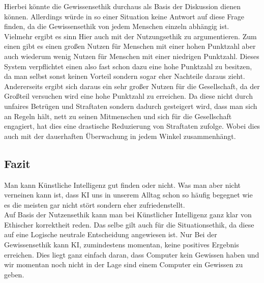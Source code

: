         Hierbei könnte die Gewissensethik durchaus als Basis der Diskussion dienen können. Allerdings würde in so einer Situation keine Antwort auf diese Frage finden, da die Gewissensethik von jedem Menschen einzeln abhängig ist.\\
        
        Vielmehr ergibt es sinn Hier auch mit der Nutzungsethik zu argumentieren. Zum einen gibt es einen großen Nutzen für Menschen mit einer hohen Punktzahl aber auch wiederum wenig Nutzen für Menschen mit einer niedrigen Punktzahl. Dieses System verpflichtet einen also fast schon dazu eine hohe Punktzahl zu besitzen, da man selbst sonst keinen Vorteil sondern sogar eher Nachteile daraus zieht.\\
        
        Andererseits ergibt sich daraus ein sehr großer Nutzen für die Gesellschaft, da der Großteil versuchen wird eine hohe Punktzahl zu erreichen. Da diese nicht durch unfaires Betrügen und Straftaten sondern dadurch gesteigert wird, dass man sich an Regeln hält, nett zu seinen Mitmenschen und sich für die Gesellschaft engagiert, hat dies eine drastische Reduzierung von Straftaten zufolge. Wobei dies auch mit der dauerhaften Überwachung in jedem Winkel zusammenhängt.
    
    \subsection{Fazit}
        Man kann Künstliche Intelligenz gut finden oder nicht. Was man aber nicht verneinen kann ist, dass KI uns in unserem Alltag schon so häufig begegnet wie es die meisten gar nicht stört sondern eher zufriedenstellt.\\
        
        Auf Basis der Nutzensethik kann man bei Künstlicher Intelligenz ganz klar von Ethischer korrektheit reden. Das selbe gilt auch für die Situationsethik, da diese auf eine Logische neutrale Entscheidung angewiesen ist. Nur Bei der Gewissensethik kann KI, zumindestens momentan, keine positives Ergebnis erreichen. Dies liegt ganz einfach daran, dass Computer kein Gewissen haben und wir momentan noch nicht in der Lage sind einem Computer ein Gewissen zu geben.